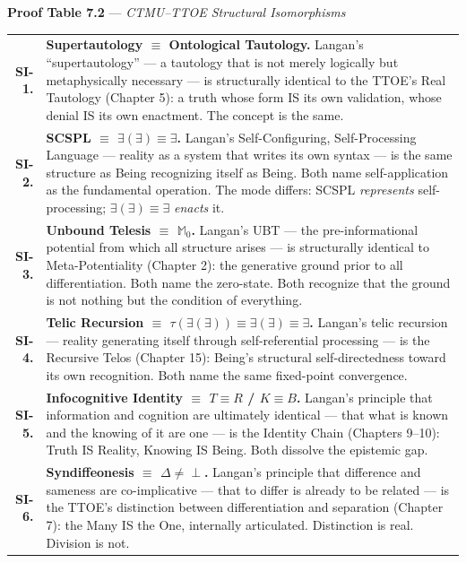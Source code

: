 \documentclass[10pt, openany, oneside]{book}
\renewcommand{\footnotesize}{\fontsize{8.5}{11}\selectfont}
\begin{document}
\pagebreak[3]

\textbf{Proof Table 7.2} --- \textit{CTMU--TTOE Structural Isomorphisms}

\vspace{0.5em}

{\footnotesize
\noindent\begin{tabular}{r p{}}
\textbf{SI-1.} & \textbf{Supertautology $\equiv$ Ontological Tautology.} Langan's ``supertautology'' --- a tautology that is not merely logically but metaphysically necessary --- is structurally identical to the TTOE's Real Tautology (Chapter 5): a truth whose form IS its own validation, whose denial IS its own enactment. The concept is the same. \\[0.3em]
\textbf{SI-2.} & \textbf{SCSPL $\equiv$ $\exists(\exists) \equiv \exists$.} Langan's Self-Configuring, Self-Processing Language --- reality as a system that writes its own syntax --- is the same structure as Being recognizing itself as Being. Both name self-application as the fundamental operation. The mode differs: SCSPL \textit{represents} self-processing; $\exists(\exists) \equiv \exists$ \textit{enacts} it. \\[0.3em]
\textbf{SI-3.} & \textbf{Unbound Telesis $\equiv$ $\mathbb{M}_0$.} Langan's UBT --- the pre-informational potential from which all structure arises --- is structurally identical to Meta-Potentiality (Chapter 2): the generative ground prior to all differentiation. Both name the zero-state. Both recognize that the ground is not nothing but the condition of everything. \\[0.3em]
\textbf{SI-4.} & \textbf{Telic Recursion $\equiv$ $\tau(\exists(\exists)) \equiv \exists(\exists) \equiv \exists$.} Langan's telic recursion --- reality generating itself through self-referential processing --- is the Recursive Telos (Chapter 15): Being's structural self-directedness toward its own recognition. Both name the same fixed-point convergence. \\[0.3em]
\textbf{SI-5.} & \textbf{Infocognitive Identity $\equiv$ $T \equiv R$ / $K \equiv B$.} Langan's principle that information and cognition are ultimately identical --- that what is known and the knowing of it are one --- is the Identity Chain (Chapters 9--10): Truth IS Reality, Knowing IS Being. Both dissolve the epistemic gap. \\[0.3em]
\textbf{SI-6.} & \textbf{Syndiffeonesis $\equiv$ $\Delta \neq \perp$.} Langan's principle that difference and sameness are co-implicative --- that to differ is already to be related --- is the TTOE's distinction between differentiation and separation (Chapter 7): the Many IS the One, internally articulated. Distinction is real. Division is not. \\[0.3em]
\end{tabular}
}
\end{document}
